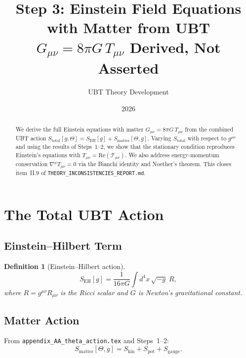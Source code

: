 \documentclass[12pt]{article}
\title{Step 3: Einstein Field Equations with Matter from UBT\\
\large $G_{\mu\nu} = 8\pi G\,T_{\mu\nu}$ Derived, Not Asserted}
\author{UBT Theory Development}
\date{2026}
\newtheorem{definition}{Definition}[section]
\begin{document}
\maketitle

\begin{abstract}
We derive the full Einstein equations with matter $G_{\mu\nu} = 8\pi G\,T_{\mu\nu}$
from the combined UBT action $S_{\mathrm{total}}[g,\Theta]
= S_{\mathrm{EH}}[g] + S_{\mathrm{matter}}[\Theta, g]$.
Varying $S_{\mathrm{total}}$ with respect to $g^{\mu\nu}$ and using the
results of Steps~1--2, we show that the stationary condition reproduces
Einstein's equations with $T_{\mu\nu} = \mathrm{Re}(\mathcal{T}_{\mu\nu})$.
We also address energy-momentum conservation $\nabla^\mu T_{\mu\nu} = 0$
via the Bianchi identity and Noether's theorem.
This closes item~II.9 of \texttt{THEORY\_INCONSISTENCIES\_REPORT.md}.
\end{abstract}

\tableofcontents

\section{The Total UBT Action}

\subsection{Einstein--Hilbert Term}

\begin{definition}[Einstein--Hilbert action]
\label{def:EH}
\begin{equation}
  \label{eq:S_EH}
  S_{\mathrm{EH}}[g] = \frac{1}{16\pi G}\int d^4x\,\sqrt{-g}\; R,
\end{equation}
where $R = g^{\mu\nu}R_{\mu\nu}$ is the Ricci scalar and
$G$ is Newton's gravitational constant.
\end{definition}

\subsection{Matter Action}

From \texttt{appendix\_AA\_theta\_action.tex} and Steps~1--2:
\begin{equation}
  \label{eq:S_matter}
  S_{\mathrm{matter}}[\Theta, g]
  = S_{\mathrm{kin}} + S_{\mathrm{pot}} + S_{\mathrm{gauge}}.
\end{equation}
\end{document}
